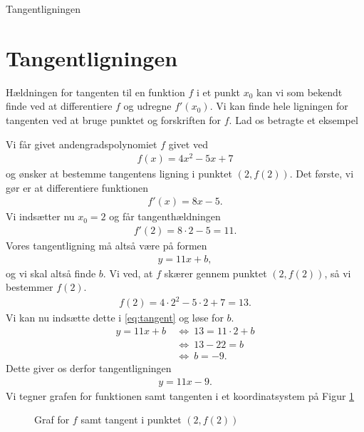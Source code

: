 \begin{center}
	\Huge
	Tangentligningen 
\end{center}

\section*{Tangentligningen}

Hældningen for tangenten til en funktion $f$ i et punkt $x_0$ kan vi som bekendt finde ved at differentiere $f$
og udregne $f'(x_0)$. Vi kan finde hele ligningen for tangenten ved at bruge punktet og forskriften for $f$. Lad os betragte et eksempel
\begin{exa}
	Vi får givet andengradspolynomiet $f$ givet ved
	\begin{align*}
		f(x) = 4x^2-5x+7
	\end{align*}
	og ønsker at bestemme tangentens ligning i punktet $(2,f(2))$. Det første, vi gør er at differentiere 
	funktionen
	\begin{align*}
		f'(x) = 8x - 5.
	\end{align*}
	Vi indsætter nu $x_0 = 2$ og får tangenthældningen
	\begin{align*}
		f'(2) = 8\cdot 2 - 5 = 11.
	\end{align*}
	Vores tangentligning må altså være på formen
	\begin{align}\label{eq:tangent}
		y = 11x + b,
	\end{align}
	og vi skal altså finde $b$. Vi ved, at $f$ skærer gennem punktet $(2,f(2))$, så vi bestemmer $f(2)$.
	\begin{align*}
		f(2) = 4\cdot 2^2-5\cdot 2 + 7 = 13.
	\end{align*}
	Vi kan nu indsætte dette i \eqref{eq:tangent} og løse for $b$.
	\begin{align*}
		y = 11x + b \ &\Leftrightarrow \ 13 = 11\cdot 2 + b \\
		&\Leftrightarrow	 \ 13 - 22 = b \\
		&\Leftrightarrow	 \ b = -9.
	\end{align*}
	Dette giver os derfor tangentligningen 
	\begin{align*}
		y = 11x-9.
	\end{align*}
	Vi tegner grafen for funktionen samt tangenten i et koordinatsystem på Figur \ref{fig:tangent}
	\begin{figure}[H]
		\centering
		\caption{Graf for $f$ samt tangent i punktet $(2,f(2))$}
		\label{fig:tangent}
	\end{figure}
	\phantom{h}
\end{exa}
